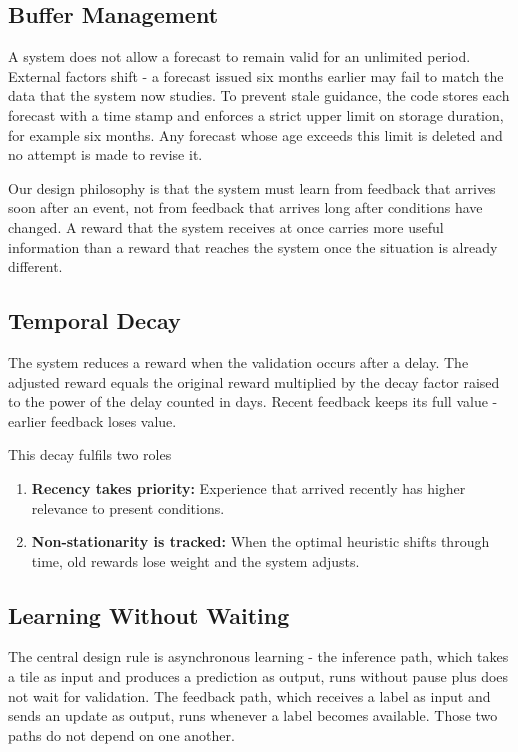 \documentclass[11pt,a4paper]{article}
\begin{document}
\subsection{Buffer Management}

A system does not allow a forecast to remain valid for an unlimited period. External factors shift - a forecast issued six months earlier may fail to match the data that the system now studies. To prevent stale guidance, the code stores each forecast with a time stamp and enforces a strict upper limit on storage duration, for example six months. Any forecast whose age exceeds this limit is deleted and no attempt is made to revise it.

Our design philosophy is that the system must learn from feedback that arrives soon after an event, not from feedback that arrives long after conditions have changed. A reward that the system receives at once carries more useful information than a reward that reaches the system once the situation is already different.

\subsection{Temporal Decay}

The system reduces a reward when the validation occurs after a delay. The adjusted reward equals the original reward multiplied by the decay factor raised to the power of the delay counted in days. Recent feedback keeps its full value - earlier feedback loses value.

This decay fulfils two roles
\begin{enumerate}
\item \textbf{Recency takes priority:} Experience that arrived recently has higher relevance to present conditions.
\item \textbf{Non-stationarity is tracked:} When the optimal heuristic shifts through time, old rewards lose weight and the system adjusts.
\end{enumerate}

\subsection{Learning Without Waiting}

The central design rule is asynchronous learning - the inference path, which takes a tile as input and produces a prediction as output, runs without pause plus does not wait for validation. The feedback path, which receives a label as input and sends an update as output, runs whenever a label becomes available. Those two paths do not depend on one another.
\end{document}

